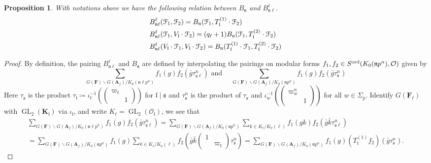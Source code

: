 \documentclass[leqno]{amsart}
\newcommand{\smat}[1]{\left( \begin{smallmatrix} #1 \end{smallmatrix} \right)}
\newcommand{\euF}{\EuScript{F}} %
\newcommand{\ord}{\textnormal{ord}}
\DeclareMathOperator{\GL}{GL}
\newcommand{\A}{\mathbf A}
\newcommand{\F}{{\mathbf{F}}} %
\newcommand{\K}{{\mathbf{K}}} %
\newcommand{\oo}{\mathcal{O}} %
\newcommand{\fs}{\mathfrak{s}}
\newcommand{\fn}{\mathfrak{n}}
\newcommand{\fl}{\mathfrak{l}}
\newtheorem{prop}[thm]{Proposition}
\theoremstyle{definition}
\theoremstyle{remark}
\begin{document}
\begin{prop}\label{prop:pair_at_deff_level}
	With notations above we have the following
	relation between $B_{\fn}$
	and $B_{\fn\ell}^\ell$.
	\begin{align*}
	&B_{\fn\ell}^{\ell}(\euF_1,\euF_2)=
	B_{\fn}(\euF_1,T_{\fl}^{(1)}\cdot \euF_2)\\
	&B_{\fn\ell}^{\ell}(\euF_1,V_{\fl}\cdot\euF_2)=
	(q_\ell+1) B_{\fn}(\euF_1,
	T_{\fl}^{(2)}\cdot\euF_2)\\
	&B_{\fn\ell}^\ell
	(V_{\fl}\cdot \euF_1,V_{\fl}\cdot\euF_2)=
	B_{\fn} (T_{\fl}^{(1)}\cdot\euF_1,
	T_{\fl}^{(2)}\cdot \euF_2)
	\end{align*}
\end{prop}
\begin{proof}
	By definition,
	the pairing $B_{\fn\ell}^\ell$
	and $B_{\fn}$ are defined by 
	interpolating the pairings 
	on modular forms
	$f_1,f_2\in S^{\ord}(K_0(\fn p^n),\oo)$
	given by 
	\[
	\sum_{G(\F)\backslash G(\A_f)/K_0(\fn\ell p^n)}
	f_1(g)f_2(\bar{g}\tau_{\fs\ell}^n)\text{ and }\quad
	\sum_{G(\F)\backslash G(\A_f)/K_0(\fn p^n)}
	f_1(g)f_2(\bar{g}\tau_{\fs}^n)
	\]
	Here $\tau_{\fs}$ is the product 
	$\tau_\fl\coloneqq
	\iota_{\fl}^{-1}(\smat{\varpi_\fl&\\&1})$
	for $\fl\mid \fs$
	and  $\tau_{\fs}^n$ is the product
	of $\tau_{\fs}$ and 
	$\iota_{w}^{-1}(\smat{\varpi_w^n&\\&1})$
	for all $w\in \Sigma_p$.
	Identify $G(\F_\ell)$ with  $\GL_2(\K_\fl)$
	via  $\iota_\fl$, and 
	write $K_\ell=\GL_2(\oo_\fl)$, we see that 
	\begin{multline*}
	\sum_{G(\F)\backslash G(\A_f)/K_0(\fn\ell p^n)}
	f_1(g)f_2(\bar{g}\tau_{\fs\ell}^n)=
	\sum_{G(\F)\backslash G(\A_f)/K_0(\fn p^n)}
	\sum_{k\in K_\ell/K_0(\ell)}
	f_1(gk)f_2(\bar{g}\bar{k}\tau_{\fs\ell}^n)\\=
	\sum_{G(\F)\backslash G(\A_f)/K_0(\fn p^n)} f_1(g)
	\sum_{k\in K_\ell/K_0(\ell)}
	f_2(\bar{g}\bar{k}\smat{1&\\&\varpi_\fl}
	\tau_{\fs}^n)=
	\sum_{G(\F)\backslash G(\A_f)/K_0(\fn p^n)} f_1(g)
	(T_\fl^{(1)}f_2)(\bar{g}\tau_{\fs}^n).
	\end{multline*}

\end{proof}
\end{document}
